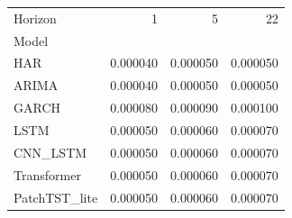 \begin{tabular}{lrrr}
\toprule
Horizon & 1 & 5 & 22 \\
Model &  &  &  \\
\midrule
HAR & 0.000040 & 0.000050 & 0.000050 \\
ARIMA & 0.000040 & 0.000050 & 0.000050 \\
GARCH & 0.000080 & 0.000090 & 0.000100 \\
LSTM & 0.000050 & 0.000060 & 0.000070 \\
CNN_LSTM & 0.000050 & 0.000060 & 0.000070 \\
Transformer & 0.000050 & 0.000060 & 0.000070 \\
PatchTST_lite & 0.000050 & 0.000060 & 0.000070 \\
\bottomrule
\end{tabular}
